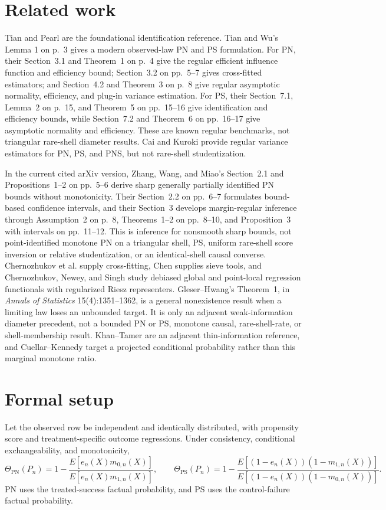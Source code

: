 \documentclass[11pt]{article}
\begin{document}
\section{Related work}
Tian and Pearl are the foundational identification reference.  Tian and Wu's Lemma 1 on p.~3 gives a modern observed-law PN and PS formulation.  For PN, their Section~3.1 and Theorem~1 on p.~4 give the regular efficient influence function and efficiency bound; Section~3.2 on pp.~5--7 gives cross-fitted estimators; and Section~4.2 and Theorem~3 on p.~8 give regular asymptotic normality, efficiency, and plug-in variance estimation.  For PS, their Section~7.1, Lemma~2 on p.~15, and Theorem~5 on pp.~15--16 give identification and efficiency bounds, while Section~7.2 and Theorem~6 on pp.~16--17 give asymptotic normality and efficiency.  These are known regular benchmarks, not triangular rare-shell diameter results.  Cai and Kuroki provide regular variance estimators for PN, PS, and PNS, but not rare-shell studentization.

In the current cited arXiv version, Zhang, Wang, and Miao's Section~2.1 and Propositions~1--2 on pp.~5--6 derive sharp generally partially identified PN bounds without monotonicity.  Their Section~2.2 on pp.~6--7 formulates bound-based confidence intervals, and their Section~3 develops margin-regular inference through Assumption~2 on p.~8, Theorems~1--2 on pp.~8--10, and Proposition~3 with intervals on pp.~11--12.  This is inference for nonsmooth sharp bounds, not point-identified monotone PN on a triangular shell, PS, uniform rare-shell score inversion or relative studentization, or an identical-shell causal converse.  Chernozhukov et al. supply cross-fitting, Chen supplies sieve tools, and Chernozhukov, Newey, and Singh study debiased global and point-local regression functionals with regularized Riesz representers.  Gleser--Hwang's Theorem~1, in \emph{Annals of Statistics} 15(4):1351--1362, is a general nonexistence result when a limiting law loses an unbounded target.  It is only an adjacent weak-information diameter precedent, not a bounded PN or PS, monotone causal, rare-shell-rate, or shell-membership result.  Khan--Tamer are an adjacent thin-information reference, and Cuellar--Kennedy target a projected conditional probability rather than this marginal monotone ratio.

\section{Formal setup}
Let the observed row be independent and identically distributed, with propensity score and treatment-specific outcome regressions.  Under consistency, conditional exchangeability, and monotonicity,
\[
\Theta_{\mathrm{PN}}(P_n)=1-\frac{E[e_n(X)m_{0,n}(X)]}{E[e_n(X)m_{1,n}(X)]},\qquad
\Theta_{\mathrm{PS}}(P_n)=1-\frac{E[(1-e_n(X))(1-m_{1,n}(X))]}{E[(1-e_n(X))(1-m_{0,n}(X))]}.
\]
PN uses the treated-success factual probability, and PS uses the control-failure factual probability.
\end{document}

